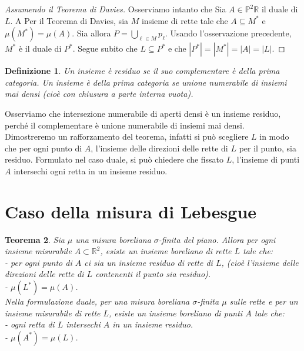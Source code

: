 \documentclass[a4paper, twoside,openright]{article}
\newcommand{\R}{\mathbb{R}}
\renewcommand{\P}{\mathbb{P}}
\newcommand{\<}{\langle}
\renewcommand{\>}{\rangle}
\newtheorem{teo}{Teorema}[]
\newtheorem{defin}[teo]{Definizione}
\begin{document}
\begin{proof}[Assumendo il Teorema di Davies]
	Osserviamo intanto che
	Sia $A \in \P^2\R$ il duale di $L$. A  Per il Teorema di Davies, sia $M$ insieme di rette tale che $A \subseteq M^*$ e $\mu(M^*)=\mu(A)$. Sia allora $P = \bigcup_{\ell\in M}p_\ell$. Usando l'osservazione precedente, $M^*$ è il duale di $P^*$. Segue subito che $L \subseteq P^*$ e che $|P^*|=|M^*|=|A|=|L|$.
\end{proof}

\begin{defin}
	Un insieme è residuo se il suo complementare è della prima categoria. Un insieme è della prima categoria se unione numerabile di insiemi mai densi (cioè con chiusura a parte interna vuota).
\end{defin}
Osserviamo che intersezione numerabile di aperti densi è un insieme residuo, perché il complementare è unione numerabile di insiemi mai densi.\\

Dimostreremo un rafforzamento del teorema, infatti si può scegliere $L$ in modo che per ogni punto di $A$, l'insieme delle direzioni delle rette di $L$ per il punto, sia residuo. Formulato nel caso duale, si può chiedere che fissato $L$, l'insieme di punti $A$ intersechi ogni retta in un insieme residuo.

\newpage

\section{Caso della misura di Lebesgue}

\begin{teo}
	Sia $\mu$ una misura boreliana $\sigma$-finita del piano. Allora per ogni insieme misurabile $A \subset \mathbb{R}^{2}$, esiste un insieme boreliano di rette $L$ tale che:\\
	- per ogni punto di $A$ ci sia un insieme residuo di rette di $L$, (cioè l'insieme delle direzioni delle rette di $L$ contenenti il punto sia residuo).\\
	- $\mu\left(L^{*}\right)=\mu(A)$.\\
	Nella formulazione duale, per una misura boreliana $\sigma$-finita $\mu$ sulle rette e per un insieme misurabile di rette $L$, esiste un insieme boreliano di punti $A$ tale che:\\
	- ogni retta di $L$ intersechi $A$ in un insieme residuo.\\
	- $\mu\left(A^{*}\right)=\mu(L)$.
\end{teo}
\end{document}
